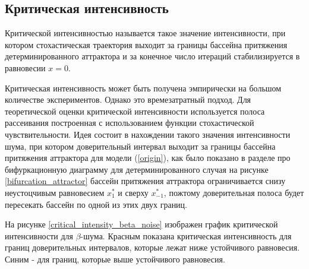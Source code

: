 \subsection{Критическая интенсивность}

    Критической интенсивностью называется такое значение интенсивности, при котором стохастическая траектория выходит за границы бассейна притяжения детерминированного аттрактора и за конечное число итераций стабилизируется в равновесии \(x = 0\).

    Критическая интенсивность может быть получена эмпирически на большом количестве экспериментов. Однако это времезатратный подход. Для теоретической оценки критической интенсивности используется полоса рассеивания построенная с использованием функции стохастической чувствительности. Идея состоит в нахождении такого значения интенсивности шума, при котором доверительный интервал выходит за границы бассейна притяжения аттрактора для модели (\ref{origin}), как было показано в разделе про бифуркационную диаграмму для детерминированного случая на рисунке \ref{bifurcation_attractor} бассейн притяжения аттрактора ограничивается снизу неустоцчивым равновесием \(x_1^*\) и сверху \(x_{-1}^*\), пожтому доверительная полоса будет пересекать бассейн по одной из этих двух границ.

    На рисунке \ref{critical_intensity_beta_noise} изображен график критической интенсивности для \(\beta\)-шума. Красным показана критическая интенсивность для границ доверительных интервалов, которые лежат ниже устойчивого равновесия. Синим - для границ, которые выше устойчивого равновесия. 


